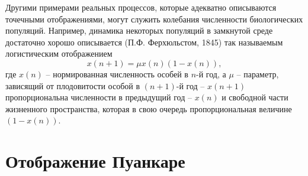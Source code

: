 Другими примерами реальных процессов, которые адекватно
описываются точечными отображениями, могут служить колебания
численности биологических популяций. Например, динамика некоторых
популяций в замкнутой среде достаточно хорошо описывается (П.Ф.
Ферхюльстом, 1845) так называемым логистическим отображением
\begin{equation}
        \label{eq:6.2}
        x(n+1) = \mu x(n) (1- x(n)),
\end{equation}
где $x(n)$ -- нормированная численность особей в $n$-й год, а $\mu$ -- параметр, зависящий от плодовитости особой
в $(n+1)$-й год -- $x(n+1)$ пропорциональна численности в предыдущий год --
$x(n)$ и свободной части жизненного пространства, которая в свою очередь пропорциональная величине $(1 - x(n))$.

\section{Отображение Пуанкаре}%
\label{sec:6.2}

